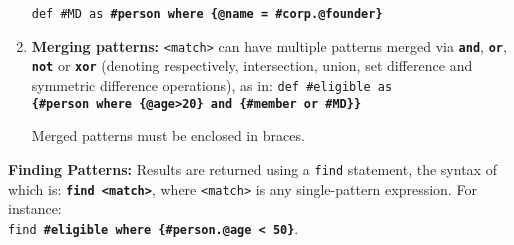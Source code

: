 \begin{enumerate}
	\texttt{\colorbox{Light}{\small def \#MD as \bfseries{\#person where \{@name = \#corp.@founder\}}}}

	\item \label{multi} \textbf{Merging patterns:} \texttt{<match>} can have multiple patterns merged via \texttt{\bf and},  \texttt{\bf or}, \texttt{\bf not} or \texttt{\bf xor} (denoting respectively, intersection, union, set difference and symmetric difference operations), as in: 
	\texttt{\colorbox{Light}{\small def \#eligible as }}\\
	\texttt{\colorbox{Light}{\small \bfseries{\{\#person where \{@age>20\} and \{\#member or \#MD\}\}}}}
	
		Merged patterns must be enclosed in  braces. 
\end{enumerate}




\textbf{Finding Patterns:}
Results are returned using a \texttt{find} statement, the syntax of which is:
\texttt{\textbf{find <match>}},
	where \texttt{<match>} is any single-pattern expression. %
	For instance: \\
	\colorbox{Light}{\small \texttt{find \bfseries{\#eligible where \{\#person.@age < 50\}}}}.	
	
